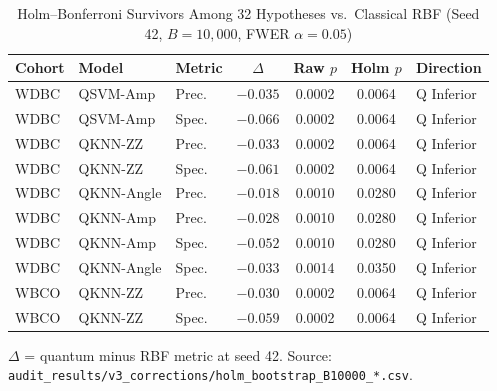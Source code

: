 \documentclass[journal,twocolumn]{IEEEtran}
\begin{document}
\begin{table}[!t]
\caption{Holm--Bonferroni Survivors Among 32 Hypotheses vs.\ Classical RBF (Seed 42, $B=10{,}000$, FWER $\alpha = 0.05$)}
\label{tab:holm}
\centering
\scriptsize
\setlength{\tabcolsep}{2.5pt}
\renewcommand{\arraystretch}{1.15}
\begin{tabular}{l l l c c c l}
\toprule
\textbf{Cohort} & \textbf{Model} & \textbf{Metric} & \textbf{$\Delta$} & \textbf{Raw $p$} & \textbf{Holm $p$} & \textbf{Direction} \\
\midrule
WDBC & QSVM-Amp   & Prec. & $-0.035$ & 0.0002 & 0.0064 & Q Inferior \\
WDBC & QSVM-Amp   & Spec. & $-0.066$ & 0.0002 & 0.0064 & Q Inferior \\
WDBC & QKNN-ZZ    & Prec. & $-0.033$ & 0.0002 & 0.0064 & Q Inferior \\
WDBC & QKNN-ZZ    & Spec. & $-0.061$ & 0.0002 & 0.0064 & Q Inferior \\
WDBC & QKNN-Angle & Prec. & $-0.018$ & 0.0010 & 0.0280 & Q Inferior \\
WDBC & QKNN-Amp   & Prec. & $-0.028$ & 0.0010 & 0.0280 & Q Inferior \\
WDBC & QKNN-Amp   & Spec. & $-0.052$ & 0.0010 & 0.0280 & Q Inferior \\
WDBC & QKNN-Angle & Spec. & $-0.033$ & 0.0014 & 0.0350 & Q Inferior \\
\midrule
WBCO & QKNN-ZZ    & Prec. & $-0.030$ & 0.0002 & 0.0064 & Q Inferior \\
WBCO & QKNN-ZZ    & Spec. & $-0.059$ & 0.0002 & 0.0064 & Q Inferior \\
\bottomrule
\end{tabular}

\vspace{2pt}
{\tiny $\Delta$ = quantum minus RBF metric at seed 42. Source: \texttt{audit\_results/v3\_corrections/holm\_bootstrap\_B10000\_*.csv}.\par}
\end{table}
\end{document}
